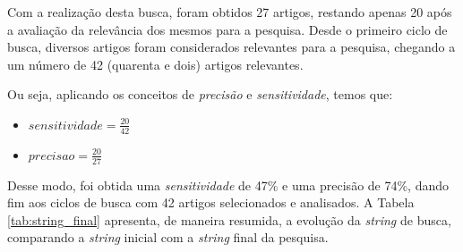 		Com a realização desta busca, foram obtidos 27 artigos, restando apenas 20 após a avaliação da relevância dos mesmos para a pesquisa. Desde o primeiro ciclo de busca, diversos artigos foram considerados relevantes para a pesquisa, chegando a um número de 42 (quarenta e dois) artigos relevantes.
		
		Ou seja, aplicando os conceitos de \textit{precisão} e \textit{sensitividade}, temos que:

		\begin{itemize}
			\item $sensitividade = \frac{20}{42}$ 
			\item $precisao = \frac{20}{27}$
		\end{itemize}

		Desse modo, foi obtida uma \textit{sensitividade} de 47\% e uma precisão de 74\%, dando fim aos ciclos de busca com 42 artigos selecionados e analisados. A Tabela \ref{tab:string_final} apresenta, de maneira resumida, a evolução da \textit{string} de busca, comparando a \textit{string} inicial com a \textit{string} final da pesquisa.

